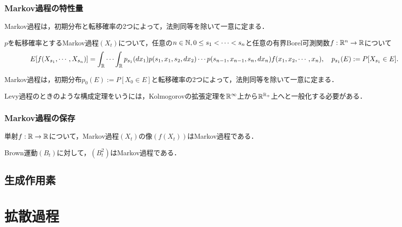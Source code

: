 \documentclass[uplatex,dvipdfmx]{jsreport}
\begin{document}
\subsection{Markov過程の特性量}

\begin{tcolorbox}[colframe=ForestGreen, colback=ForestGreen!10!white,breakable,colbacktitle=ForestGreen!40!white,coltitle=black,fonttitle=\bfseries\sffamily,
title=]
    Markov過程は，初期分布と転移確率の2つによって，法則同等を除いて一意に定まる．
\end{tcolorbox}

\begin{lemma}
    $p$を転移確率とするMarkov過程$(X_t)$について，任意の$n\in\mathbb{N},0\le s_1<\cdots<s_n$と任意の有界Borel可測関数$f:\mathbb{R}^n\to\mathbb{R}$について
    \[E[f(X_{s_1},\cdots,X_{s_n})]=\int_{\mathbb{R}}\cdots\int_{\mathbb{R}} p_{s_1}(dx_1)p(s_1,x_1,s_2,dx_2)\cdots p(s_{n-1},x_{n-1},s_n,dx_n)f(x_1,x_2,\cdots,x_n),\quad  p_{s_1}(E):=P[X_{s_1}\in E].\]
\end{lemma}

\begin{corollary}
    Markov過程は，初期分布$p_0(E):=P[X_0\in E]$と転移確率の2つによって，法則同等を除いて一意に定まる．
\end{corollary}
\begin{remark}
    Levy過程のときのような構成定理をいうには，Kolmogorovの拡張定理を$\mathbb{R}^\infty$上から$\mathbb{R}^{\mathbb{R}_+}$上へと一般化する必要がある．
\end{remark}

\subsection{Markov過程の保存}

\begin{proposition}
    単射$f:\mathbb{R}\to\mathbb{R}$について，Markov過程$(X_t)$の像$(f(X_t))$はMarkov過程である．
\end{proposition}

\begin{proposition}
    Brown運動$(B_t)$に対して，$(B_t^2)$はMarkov過程である．
\end{proposition}

\section{生成作用素}



\chapter{拡散過程}
\end{document}
